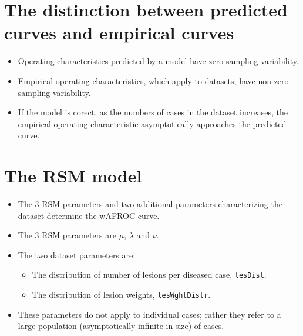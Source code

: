 \documentclass[
]{book}
\newenvironment{Shaded}{\begin{snugshade}}{\end{snugshade}}
\newcommand{\CommentTok}[1]{\textcolor[rgb]{0.56,0.35,0.01}{\textit{#1}}}
\newcommand{\KeywordTok}[1]{\textcolor[rgb]{0.13,0.29,0.53}{\textbf{#1}}}
\newcommand{\NormalTok}[1]{#1}
\newcommand{\OperatorTok}[1]{\textcolor[rgb]{0.81,0.36,0.00}{\textbf{#1}}}
\providecommand{\tightlist}{%
  \setlength{\itemsep}{0pt}\setlength{\parskip}{0pt}}
\begin{document}
\hypertarget{the-distinction-between-predicted-curves-and-empirical-curves}{%
\section{The distinction between predicted curves and empirical curves}\label{the-distinction-between-predicted-curves-and-empirical-curves}}

\begin{itemize}
\tightlist
\item
  Operating characteristics predicted by a model have zero sampling variability.\\
\item
  Empirical operating characteristics, which apply to datasets, have non-zero sampling variability.
\item
  If the model is corect, as the numbers of cases in the dataset increases, the empirical operating characteristic asymptotically approaches the predicted curve.
\end{itemize}

\hypertarget{the-rsm-model}{%
\section{The RSM model}\label{the-rsm-model}}

\begin{itemize}
\tightlist
\item
  The 3 RSM parameters and two additional parameters characterizing the dataset determine the wAFROC curve.
\item
  The 3 RSM parameters are \(\mu\), \(\lambda\) and \(\nu\).
\item
  The two dataset parameters are:

  \begin{itemize}
  \tightlist
  \item
    The distribution of number of lesions per diseased case, \texttt{lesDist}.
  \item
    The distribution of lesion weights, \texttt{lesWghtDistr}.
  \end{itemize}
\item
  These parameters do not apply to individual cases; rather they refer to a large population (asymptotically infinite in size) of cases.
\end{itemize}

\begin{Shaded}
\end{Shaded}
\end{document}
